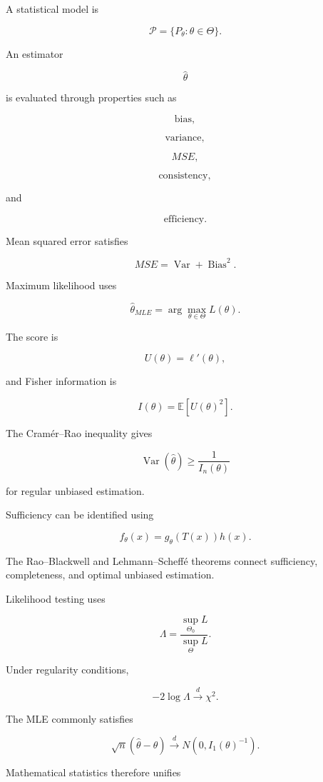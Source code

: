 A statistical model is

\[
\boxed{
\mathcal{P}
=
\{
P_\theta:
\theta\in\Theta
\}.
}
\]

An estimator

\[
\widehat{\theta}
\]

is evaluated through properties such as

\[
\boxed{
\text{bias},
}
\]

\[
\boxed{
\text{variance},
}
\]

\[
\boxed{
MSE,
}
\]

\[
\boxed{
\text{consistency},
}
\]

and

\[
\boxed{
\text{efficiency}.
}
\]

Mean squared error satisfies

\[
\boxed{
MSE
=
\operatorname{Var}
+
\operatorname{Bias}^2.
}
\]

Maximum likelihood uses

\[
\boxed{
\widehat{\theta}_{MLE}
=
\arg\max_{\theta\in\Theta}
L(\theta).
}
\]

The score is

\[
\boxed{
U(\theta)
=
\ell'(\theta),
}
\]

and Fisher information is

\[
\boxed{
I(\theta)
=
\mathbb{E}
[
U(\theta)^2
].
}
\]

The Cramér--Rao inequality gives

\[
\boxed{
\operatorname{Var}
(
\widehat{\theta}
)
\geq
\frac1{
I_n(\theta)
}
}
\]

for regular unbiased estimation.

Sufficiency can be identified using

\[
\boxed{
f_\theta(x)
=
g_\theta(T(x))h(x).
}
\]

The Rao--Blackwell and Lehmann--Scheffé theorems connect sufficiency,
completeness, and optimal unbiased estimation.

Likelihood testing uses

\[
\boxed{
\Lambda
=
\frac{
\sup_{\Theta_0}L
}{
\sup_{\Theta}L
}.
}
\]

Under regularity conditions,

\[
\boxed{
-2\log\Lambda
\xrightarrow{d}
\chi^2.
}
\]

The MLE commonly satisfies

\[
\boxed{
\sqrt{n}
(
\widehat{\theta}-\theta
)
\xrightarrow{d}
N
\left(
0,
I_1(\theta)^{-1}
\right).
}
\]

Mathematical statistics therefore unifies

